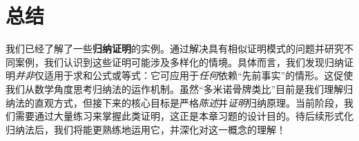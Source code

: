 \section{总结}

我们已经了解了一些\textbf{归纳证明}的实例。通过解决具有相似证明模式的问题并研究不同案例，我们认识到这些证明可能涉及多样化的情境。具体而言，我们发现归纳证明\emph{并非}仅适用于求和公式或等式：它可应用于\emph{任何}依赖``先前事实''的情形。这促使我们从数学角度思考归纳法的运作机制。虽然``多米诺骨牌类比''目前是我们理解归纳法的直观方式，但接下来的核心目标是严格\emph{陈述}并\emph{证明}归纳原理。当前阶段，我们需要通过大量练习来掌握此类证明，这正是本章习题的设计目的。待后续形式化归纳法后，我们将能更熟练地运用它，并深化对这一概念的理解！